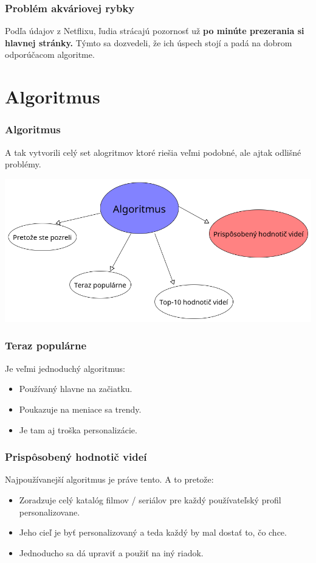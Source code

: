 \documentclass{beamer}
\begin{document}
\begin{frame}[fragile=singleslide]\frametitle{Problém akváriovej rybky}
    Podľa údajov z Netflixu, ľudia strácajú pozornosť už \textbf{po minúte prezerania si hlavnej stránky.} Týmto sa dozvedeli, že ich úspech stojí a padá na dobrom odporúčacom algoritme.
\end{frame}

\section{Algoritmus}

\begin{frame}[fragile=singleslide]\frametitle{Algoritmus}

    A tak vytvorili celý set alogritmov ktoré riešia veľmi podobné, ale ajtak odlišné problémy.
    \begin{center}
        \includegraphics[scale=.3]{DiagramAlgoritmus.png}
    \end{center}


\end{frame}

\begin{frame}[fragile=singleslide]\frametitle{Teraz populárne}
    Je veľmi jednoduchý algoritmus:
    \begin{itemize}
        \item Používaný hlavne na začiatku.
        \item Poukazuje na meniace sa trendy.
        \item Je tam aj troška personalizácie.
    \end{itemize}
\end{frame}

\begin{frame}[fragile=singleslide]\frametitle{Prispôsobený hodnotič videí}
    Najpoužívanejší algoritmus je práve tento. A to pretože:
    \begin{itemize}
        \item Zoradzuje celý katalóg filmov / seriálov pre každý používateľský profil personalizovane.
        \item Jeho cieľ je byť personalizovaný a teda každý by mal dostať to, čo chce.
        \item Jednoducho sa dá upraviť a použiť na iný riadok.
    \end{itemize}
\end{frame}
\end{document}

